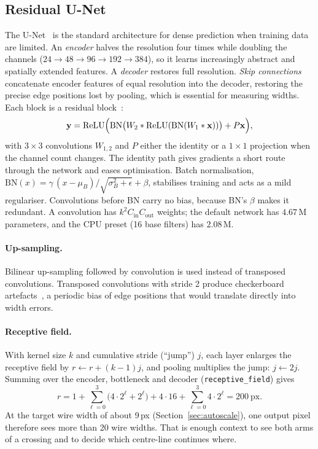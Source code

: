 \documentclass[11pt,a4paper]{article}
\newcommand{\code}[1]{\texttt{#1}}
\begin{document}
\subsection{Residual U-Net}
The U-Net~\cite{ronneberger2015} is the standard architecture for dense prediction when training data are limited. An \emph{encoder} halves the resolution four times while doubling the channels ($24\to48\to96\to192\to384$), so it learns increasingly abstract and spatially extended features. A \emph{decoder} restores full resolution. \emph{Skip connections} concatenate encoder features of equal resolution into the decoder, restoring the precise edge positions lost by pooling, which is essential for measuring widths. Each block is a residual block~\cite{he2016}:
\begin{equation}
\mathbf y=\mathrm{ReLU}\Bigl(\mathrm{BN}\bigl(W_2*\mathrm{ReLU}(\mathrm{BN}(W_1*\mathbf x))\bigr)+P\mathbf x\Bigr),
\end{equation}
with $3\times3$ convolutions $W_{1,2}$ and $P$ either the identity or a $1\times1$ projection when the channel count changes. The identity path gives gradients a short route through the network and eases optimisation. Batch normalisation,
$\mathrm{BN}(x)=\gamma\,(x-\mu_B)/\sqrt{\sigma_B^2+\epsilon}+\beta$,
stabilises training and acts as a mild regulariser. Convolutions before BN carry no bias, because BN's $\beta$ makes it redundant. A convolution has $k^2C_{\text{in}}C_{\text{out}}$ weights; the default network has $4.67$\,M parameters, and the CPU preset (16 base filters) has $2.08$\,M.

\paragraph{Up-sampling.} Bilinear up-sampling followed by convolution is used instead of transposed convolutions. Transposed convolutions with stride 2 produce checkerboard artefacts~\cite{odena2016}, a periodic bias of edge positions that would translate directly into width errors.

\paragraph{Receptive field.} With kernel size $k$ and cumulative stride (``jump'') $j$, each layer enlarges the receptive field by $r\leftarrow r+(k-1)j$, and pooling multiplies the jump: $j\leftarrow 2j$. Summing over the encoder, bottleneck and decoder (\code{receptive\_field}) gives
\begin{equation}
r = 1+\sum_{\ell=0}^{3}\bigl(4\cdot2^\ell+2^\ell\bigr)+4\cdot 16+\sum_{\ell=0}^{3}4\cdot2^\ell = 200\ \text{px}.
\end{equation}
At the target wire width of about 9\,px (Section~\ref{sec:autoscale}), one output pixel therefore sees more than 20 wire widths. That is enough context to see both arms of a crossing and to decide which centre-line continues where.
\end{document}
